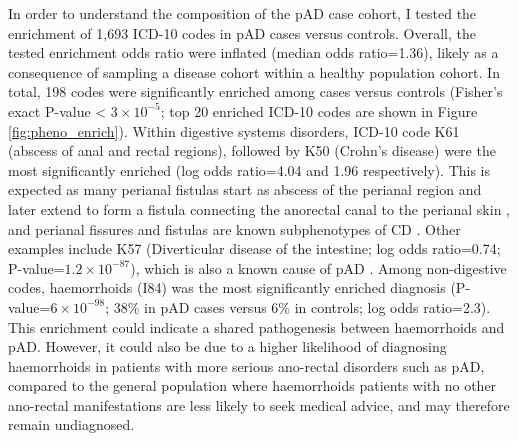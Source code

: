   In order to understand the composition of the pAD case cohort, I tested the enrichment of 1,693 ICD-10 codes in pAD cases versus controls. Overall, the tested enrichment odds ratio were inflated (median odds ratio=1.36), likely as a consequence of sampling a disease cohort within a healthy population cohort. In total, 198 codes were significantly enriched among cases versus controls (Fisher's exact  P-value < $3\times10^{-5}$; top 20 enriched ICD-10 codes are shown in Figure \ref{fig:pheno_enrich}).  Within digestive systems disorders, ICD-10 code K61 (abscess of anal and rectal regions), followed by K50 (Crohn's disease) were the most significantly enriched (log odds ratio=4.04 and 1.96 respectively). This is expected as many perianal fistulas start as abscess of the perianal region and later extend to form a fistula connecting the anorectal canal to the perianal skin \cite{abscess_fist}, and perianal fissures and fistulas are known subphenotypes of CD \cite{Marzo2015-wf}. Other examples include K57 (Diverticular disease of the intestine; log odds ratio=0.74; P-value=$1.2\times10^{-87}$), which is also a known cause of pAD \cite{div_pad}. Among non-digestive codes, haemorrhoids (I84) was the most significantly enriched diagnosis (P-value=$6\times10^{-98}$; 38\% in pAD cases versus 6\% in controls; log odds ratio=2.3). This enrichment could indicate a shared pathogenesis between haemorrhoids and pAD. However, it could also be due to a higher likelihood of diagnosing haemorrhoids in patients with more serious ano-rectal disorders such as pAD, compared to the general population where haemorrhoids patients with no other ano-rectal manifestations are less likely to seek medical advice, and may therefore remain undiagnosed. \\




